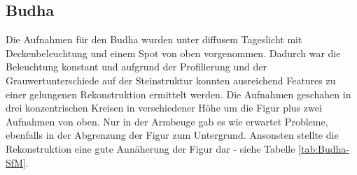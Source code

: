 \documentclass[]{article}
\begin{document}
\subsection{Budha}

Die Aufnahmen für den Budha wurden unter diffusem Tageslicht mit Deckenbeleuchtung und einem Spot von oben vorgenommen. Dadurch war die Beleuchtung konstant und aufgrund der Profilierung und der Grauwertunterschiede auf der Steinstruktur konnten ausreichend Features zu einer gelungenen Rekonstruktion ermittelt werden. Die Aufnahmen geschahen in drei konzentrischen Kreisen in verschiedener Höhe um die Figur plus zwei Aufnahmen von oben.
Nur in der Armbeuge gab es wie erwartet Probleme, ebenfalls in der Abgrenzung der Figur zum Untergrund. Ansonsten stellte die Rekonstruktion eine gute Annäherung der Figur dar - siehe Tabelle \ref{tab:Budha-SfM}.
\end{document}
